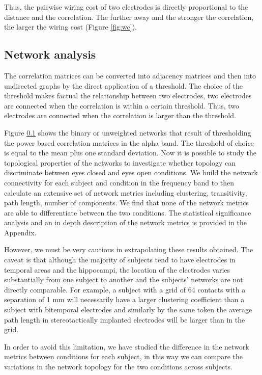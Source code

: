 \documentclass[11pt, onecolumn]{article}
\begin{document}
Thus, the pairwise wiring cost of two electrodes is directly proportional to the distance and the correlation. The further away and the stronger the correlation, the larger the wiring cost (Figure \ref{fig:wc}). 

\subsection{Network analysis}
The correlation matrices can be converted into adjacency matrices and then into undirected graphs by the direct application of a threshold. The choice of the threshold makes factual the relationship between two electrodes, two electrodes are connected when the correlation is within a certain threshold. Thus, two electrodes are connected when the correlation is larger than the threshold.

Figure \ref{} shows the binary or unweighted networks that result of thresholding the power based correlation matrices in the alpha band. The threshold of choice is equal to the mean plus one standard deviation.
Now it is possible to study the topological properties of the networks to investigate whether topology can discriminate between eyes closed and eyes open conditions.  
We build the network connectivity for each subject and condition in the  frequency band to then calculate an extensive set of network metrics including clustering, transitivity, path length, number of components.
We find that none of the network metrics are able to differentiate between the two conditions. The statistical significance analysis and an in depth description of the network metrics is provided in the Appendix.

However, we must be very cautious in extrapolating these results obtained. The caveat is that although the majority of subjects tend to have electrodes in temporal areas and the hippocampi, the location of the electrodes varies substantially from one subject to another and the subjects’ networks are not directly comparable. For example, a subject with a grid of 64 contacts with a separation of 1 mm will necessarily have a larger clustering coefficient than a subject with bitemporal electrodes and similarly  by the same token the average path length in stereotactically implanted electrodes will be larger than in the grid. 

In order to avoid this limitation, we have studied the difference in the network metrics between conditions for each subject, in this way we can compare the variations in the network topology for the two conditions across subjects.
\end{document}
